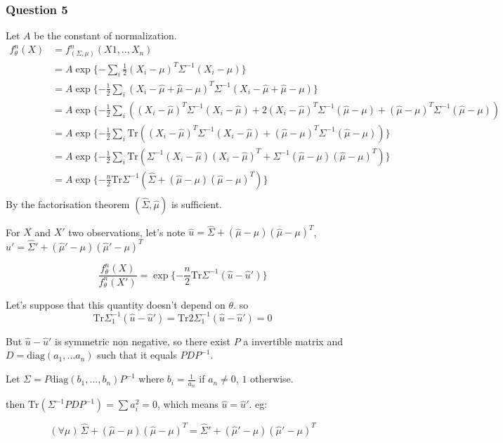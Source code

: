 \documentclass[12pt]{article}
\newcommand{\Q}[1]{\subsubsection*{Question #1}}
\begin{document}
\Q{5}

Let $A$ be the constant of normalization.
\begin{align*}
f^n_{\theta}(X) &= 
f^n_{(\Sigma, \mu)}(X1, .., X_n)\\
&=A  \exp\{- \sum_i \frac12 (X_i-\mu)^T\Sigma^{-1}(X_i-\mu)\}  \\
&=A  \exp\{- \frac12 \sum_i (X_i-\hat \mu + \hat \mu - \mu)^T\Sigma^{-1}(X_i-\hat \mu + \hat \mu - \mu)\}  \\
&=A  \exp\{- \frac12 \sum_i   \left(
(X_i-\hat \mu)^T\Sigma^{-1}(X_i-\hat \mu)
+ 2 (X_i-\hat \mu)^T\Sigma^{-1}(\hat \mu- \mu)
+ (\hat \mu - \mu)^T\Sigma^{-1} (\hat \mu - \mu)
\right)\\
&=A  \exp\{- \frac12 \sum_i  
\text{Tr} 
\left((X_i-\hat \mu)^T\Sigma^{-1}(X_i-\hat \mu)
+ (\hat \mu - \mu)^T\Sigma^{-1} (\hat \mu - \mu)
\right)\}\\
&=A  \exp\{- \frac12  \sum_i 
\text{Tr} 
\left(\Sigma^{-1}(X_i-\hat \mu)(X_i-\hat \mu)^T
+ \Sigma^{-1} (\hat \mu - \mu)(\hat \mu - \mu)^T
\right)
\}\\
&=A \exp\{-  \frac n 2 
\text{Tr} 
\Sigma^{-1}
\left(
\hat \Sigma
+ (\hat \mu - \mu)(\hat \mu - \mu)^T
\right)
\}\\
\end{align*}
By the factorisation theorem $(\hat \Sigma, \hat \mu)$ is sufficient.


For $X$ and $X'$ two observations, let's note $\hat u = \hat \Sigma+ (\hat \mu - \mu)(\hat \mu - \mu)^T$, $\hat u' = \hat \Sigma'+ (\hat \mu' - \mu)(\hat \mu' - \mu)^T$

$$\frac{f^n_{\theta}(X)}{ f^n_{\theta}(X')} = 
\exp\{-  \frac n 2 
\text{Tr} 
\Sigma^{-1}
\left(
\hat u - \hat u'
\right)
\}
$$


Let's suppose that this quantity doesn't depend on $\theta$. so
$$\text{Tr} 
\Sigma^{-1}_1 
\left(
\hat u - \hat u'
\right) =
\text{Tr} 
2 \Sigma^{-1}_1 
\left(
\hat u - \hat u'
\right) = 0$$


But $\hat u - \hat u'$ is symmetric non negative, so there exist $P$ a invertible matrix and $D = \text{diag}(a_1, ... a_n)$ such that it equals $PDP^{-1}$.


Let $\Sigma = P \text{diag}( b_1 ,...,b_n ) P^{-1}$ where $b_i = \frac{1}{a_n}$ if $a_n \neq 0$, $1$ otherwise.

then $\text{Tr}(\Sigma^{-1}PDP^{-1}) = \sum a_i^2 = 0$, which means $\hat u = \hat u'$. eg:


$$(\forall \mu)\, \hat \Sigma+ (\hat \mu - \mu)(\hat \mu - \mu)^T = \hat \Sigma'+ (\hat \mu' - \mu)(\hat \mu' - \mu)^T$$
\end{document}
